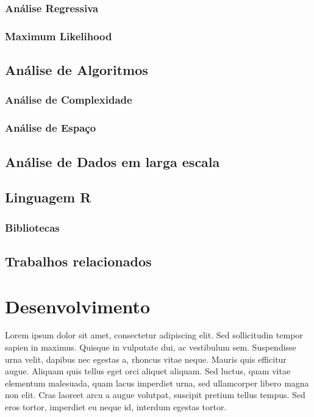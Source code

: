 \documentclass[
	12pt,				%
	openright,			%
	oneside,			%
	a4paper,			%
	english,			%
	brazil				%
	]{abntex2}
\begin{document}
\subsection{Análise Regressiva}
\subsection{Maximum Likelihood}
\section{Análise de Algoritmos}
\subsection{Análise de Complexidade}
\subsection{Análise de Espaço}
\section{Análise de Dados em larga escala}
\section{Linguagem R}
\subsection{Bibliotecas}
\section{Trabalhos relacionados}

 \chapter{Desenvolvimento}

 Lorem ipsum dolor sit amet, consectetur adipiscing elit. Sed sollicitudin tempor sapien in maximus. Quisque in vulputate dui, ac vestibulum sem. Suspendisse urna velit, dapibus nec egestas a, rhoncus vitae neque. Mauris quis efficitur augue. Aliquam quis tellus eget orci aliquet aliquam. Sed luctus, quam vitae elementum malesuada, quam lacus imperdiet urna, sed ullamcorper libero magna non elit. Cras laoreet arcu a augue volutpat, suscipit pretium tellus tempus. Sed eros tortor, imperdiet eu neque id, interdum egestas tortor.
\end{document}

